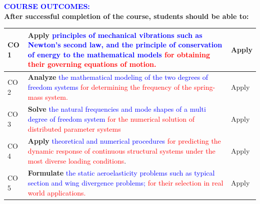 \documentclass[11pt,paper=a4,answers]{exam}
\begin{document}
\flushleft\textbf{\textcolor{blue}{\large COURSE OUTCOMES:}}\\


\textbf{After successful completion of the course, students should be able to:}\\
\renewcommand{\arraystretch}{1.1}\vspace{-0.75cm}
\begin{flushleft}
	\begin{longtable}{|C{1.5cm}|R{12.5cm}|C{1.5cm}|}
		\hline
		CO 1 &	\textbf{Apply} \textcolor{blue}{ principles of mechanical vibrations such as Newton’s second law, and
			the principle of conservation of energy to the mathematical models  } \textcolor{red}{for obtaining
			their governing equations of motion.}&Apply\tabularnewline
		\hline
		CO 2&	\textbf{Analyze} \textcolor{blue}{   the mathematical modeling of the two degrees of
			freedom systems} \textcolor{red}{ for determining the frequency of the spring-mass system.}&	Apply\tabularnewline
		\hline
		CO 3&	\textbf{Solve} \textcolor{blue}{ the natural frequencies and mode shapes of a multi
			degree of freedom system } \textcolor{red}{for the numerical solution of distributed parameter systems}&	Apply\tabularnewline
		\hline 
		
		CO 4&	\textbf{Apply} \textcolor{blue}{  theoretical and numerical procedures } \textcolor{red}{for predicting the dynamic response of  continuous structural systems under the most diverse loading conditions}.	&Apply\tabularnewline
		\hline		
		CO 5&\textbf{Formulate } \textcolor{blue}{ the static aeroelasticity problems such as typical section and wing divergence
			problems; }\textcolor{red}{ for their selection in real world
			applications.}	&	Apply\tabularnewline
		
		
		\hline
	\end{longtable}
\end{flushleft}
\end{document}
